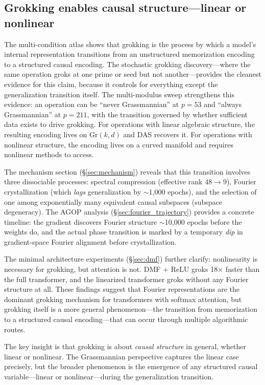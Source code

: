 \documentclass{article}
\newcommand{\Gr}{\mathrm{Gr}}
\begin{document}
\subsection{Grokking enables causal structure---linear or nonlinear}

The multi-condition atlas shows that grokking is the process by which a model's
internal representation transitions from an unstructured memorization encoding to
a structured causal encoding. The stochastic grokking discovery---where the same
operation groks at one prime or seed but not another---provides the cleanest
evidence for this claim, because it controls for everything except the
generalization transition itself. The multi-modulus sweep strengthens this
evidence: an operation can be ``never Grassmannian'' at $p{=}53$ and ``always
Grassmannian'' at $p{=}211$, with the transition governed by whether sufficient
data exists to drive grokking. For operations with linear algebraic structure,
the resulting encoding lives on $\Gr(k,d)$ and DAS recovers it. For operations
with nonlinear structure, the encoding lives on a curved manifold and requires
nonlinear methods to access.

The mechanism section (\S\ref{sec:mechanism}) reveals that this transition
involves three dissociable processes: spectral compression (effective rank
$48 \to 9$), Fourier crystallization (which \emph{lags} generalization by
$\sim$1{,}000 epochs), and the selection of one among exponentially many
equivalent causal subspaces (subspace degeneracy). The AGOP analysis
(\S\ref{sec:fourier_trajectory}) provides a concrete timeline: the gradient
discovers Fourier structure $\sim$10{,}000 epochs before the weights do,
and the actual phase transition is marked by a temporary \emph{dip} in
gradient-space Fourier alignment before crystallization.

The minimal architecture experiments (\S\ref{sec:dmf}) further clarify:
nonlinearity is necessary for grokking, but attention is not. DMF + ReLU
groks 18$\times$ faster than the full transformer, and the linearized
transformer groks without any Fourier structure at all. These findings
suggest that Fourier representations are the dominant grokking mechanism
for transformers with softmax attention, but grokking itself is a more
general phenomenon---the transition from memorization to a structured
causal encoding---that can occur through multiple algorithmic routes.

The key insight is that grokking is about \emph{causal structure} in general,
whether linear or nonlinear. The Grassmannian perspective captures the linear
case precisely, but the broader phenomenon is the emergence of any structured
causal variable---linear or nonlinear---during the generalization transition.
\end{document}
